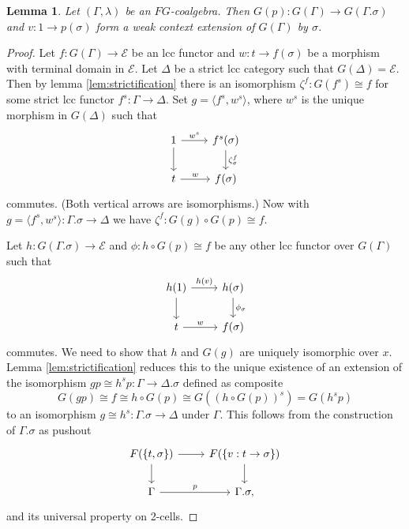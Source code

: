 \documentclass[a4paper]{article}
\newtheorem{lemma}[theorem]{Lemma}
\theoremstyle{remark}
\theoremstyle{definition}
\begin{document}
\begin{lemma}
  \label{lem:strict-ext-is-weak-ext}
  Let $(\Gamma, \lambda)$ be an $FG$-coalgebra.
  Then $G(p) : G(\Gamma) \rightarrow G(\Gamma.\sigma)$ and $v : 1 \rightarrow p(\sigma)$ form a weak context extension of $G(\Gamma)$ by $\sigma$.
\end{lemma}
\begin{proof}
  Let $f : G(\Gamma) \rightarrow \mathcal{E}$ be an lcc functor and $w : t \rightarrow  f(\sigma)$ be a morphism with terminal domain in $\mathcal{E}$.
  Let $\Delta$ be a strict lcc category such that $G(\Delta) = \mathcal{E}$.
  Then by lemma \ref{lem:strictification} there is an isomorphism $\zeta^f : G(f^s) \cong f$ for some strict lcc functor $f^s : \Gamma \rightarrow \Delta$.
  Set $g = \langle f^s, w^s \rangle$, where $w^s$ is the unique morphism in $G(\Delta)$ such that
  \begin{equation}
    \begin{tikzcd}
      1 \arrow[d] \arrow[r, "w^s"] & f^s(\sigma) \arrow[d, "\zeta^f_\sigma"] \\
      t \arrow[r, "w"] & f(\sigma)
    \end{tikzcd}
  \end{equation}
  commutes.
  (Both vertical arrows are isomorphisms.)
  Now with $g = \langle f^s, w^s \rangle : \Gamma.\sigma \rightarrow \Delta$ we have $\zeta^f : G(g) \circ G(p) \cong f$.

  Let $h : G(\Gamma.\sigma) \rightarrow \mathcal{E}$ and $\phi : h \circ G(p) \cong f$ be any other lcc functor over $G(\Gamma)$ such that
  \begin{equation}
    \begin{tikzcd}
      h(1) \arrow[d] \arrow[r, "h(v)"] & h(\sigma) \arrow[d, "\phi_\sigma"] \\
      t \arrow[r, "w"] & f(\sigma)
    \end{tikzcd}
  \end{equation}
  commutes.
  We need to show that $h$ and $G(g)$ are uniquely isomorphic over $x$.
  Lemma \ref{lem:strictification} reduces this to the unique existence of an extension of the isomorphism $g p \cong h^s p : \Gamma \rightarrow \Delta.\sigma$ defined as composite
  \begin{equation}
    G(gp) \cong f \cong h \circ G(p) \cong G((h \circ G(p))^s) = G(h^s p)
  \end{equation}
  to an isomorphism $g \cong h^s : \Gamma.\sigma \rightarrow \Delta$ under $\Gamma$.
  This follows from the construction of $\Gamma.\sigma$ as pushout
  \begin{equation}
    \begin{tikzcd}
      F(\{ t, \sigma \}) \arrow[d] \arrow[r] & F(\{ v : t \rightarrow \sigma \}) \arrow[d] \\
      \Gamma \arrow[r, "p"] & \Gamma.\sigma,
    \end{tikzcd}
  \end{equation}
  and its universal property on 2-cells.
\end{proof}
\end{document}
